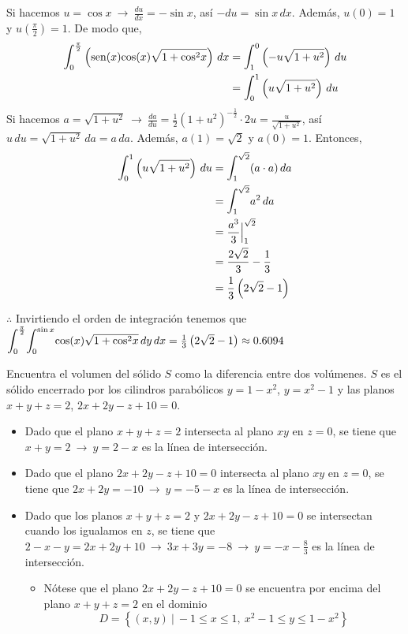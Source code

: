 \documentclass[12pt]{exam}
\begin{document}
\begin{questions}
\begin{enumerate}[a)]
    Si hacemos $u=\cos{x} ~\rightarrow~ \frac{du}{dx}=-\sin{x}$, así $-du=\sin{x\,dx}$. Además, $u(0)=1$ y $u(\frac{\pi}{2})=1$. De modo que,
    \begin{align*}
      \mathlarger{\int}_0^{\frac{\pi}{2}}\left( \text{sen}(x)\text{cos}(x)\sqrt{1+\text{cos}^2x}\right)\,dx
      &= 
      \mathlarger{\int}_1^0\left( -u\sqrt{1+u^2}\right)\,du \\
      &= \mathlarger{\int}_0^1\left( u\sqrt{1+u^2}\right)\,du \\
    \end{align*}
    Si hacemos $a=\sqrt{1+u^2}~\rightarrow ~ \frac{da}{du}=\frac{1}{2}(1+u^2)^{-\frac{1}{2}}\cdot 2u= \frac{u}{\sqrt{1+u^2}}$, así $u\,du = \sqrt{1+u^2}\, da=a\,da$. Además, $a(1)=\sqrt{2}$ y $a(0)=1$. Entonces, 
    \begin{align*}
      \mathlarger{\int}_0^1\left( u\sqrt{1+u^2}\right)\,du
      &= \mathlarger{\int}_1^{\sqrt{2}} (a\cdot a)\,da\\
      &= \mathlarger{\int}_1^{\sqrt{2}} a^2\,da\\
      &= \frac{a^3}{3}\Big|_1^{\sqrt{2}}\\
      &= \frac{2\sqrt{2}}{3}- \frac{1}{3}\\
      &= \frac{1}{3}\left(2\sqrt{2}-1\right)
    \end{align*}

    $\therefore$  Invirtiendo el orden de integración tenemos que $\mathlarger{\int}_0^{\frac{\pi}{2}}\mathlarger{\int}_0^{\sin{x}} \text{cos}(x)\sqrt{1+\text{cos}^2x}\, dy\,dx = \frac{1}{3}\left(2\sqrt{2}-1\right) \approx 0.6094$
  \end{enumerate}

  \question
  Encuentra el volumen del sólido $S$ como la diferencia entre dos volúmenes. $S$ es el sólido encerrado por los cilindros parabólicos $y=1-x^2$, $y=x^2-1$ y las planos $x+y+z=2$, $2x+2y-z+10=0$.

  \begin{itemize}
  \item Dado que el plano $x+y+z=2$ intersecta al plano $xy$ en $z=0$, se tiene que $x+y=2~\rightarrow ~y=2-x$ es la línea de intersección.
  \item Dado que el plano $2x+2y-z+10=0$ intersecta al plano $xy$ en $z=0$, se tiene que $2x+2y=-10~\rightarrow ~y=-5-x$ es la línea de intersección.
  \item Dado que los planos $x+y+z=2$ y $2x+2y-z+10=0$ se intersectan cuando los igualamos en $z$, se tiene que $2-x-y=2x+2y+10~\rightarrow ~ 3x+3y=-8 ~ \rightarrow ~ y = -x-\frac{8}{3}$ es la línea de intersección.
    \begin{itemize}
    \item Nótese que el plano $2x+2y-z+10=0$ se encuentra por encima del plano $x+y+z=2$ en el dominio
      $$D=\left\{(x,y)~|~-1\leq x\leq 1, ~ x^2-1\leq y \leq 1-x^2\right\}$$
    \end{itemize}
  \end{itemize}


\end{questions}
\end{document}

